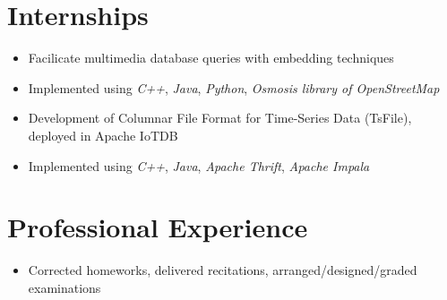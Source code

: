 \documentclass{resume}
\begin{document}
\section{Internships}

\begin{itemize}
  \item Facilicate multimedia database queries with embedding techniques
  \item Implemented using \emph{C++}, \emph{Java}, \emph{Python}, \emph{Osmosis library of OpenStreetMap}
\end{itemize}

\begin{itemize}
  \item Development of Columnar File Format for Time-Series Data (TsFile), deployed in Apache IoTDB
  \item Implemented using \emph{C++}, \emph{Java}, \emph{Apache Thrift}, \emph{Apache Impala}
\end{itemize}

% 
% 

\section{Professional Experience}
\begin{itemize}
  \item Corrected homeworks, delivered recitations, arranged/designed/graded examinations
\end{itemize}

% 
% 
\end{document}
